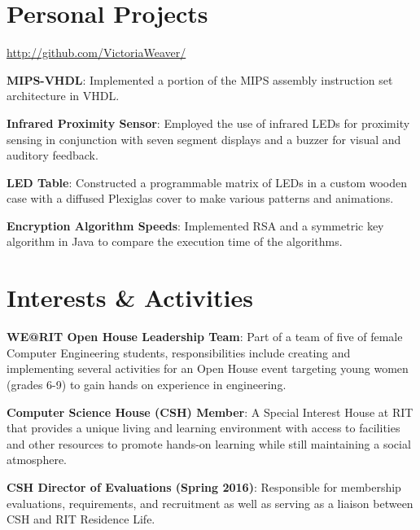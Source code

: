 \documentclass[a4paper,margin,line]{resume}
\begin{document}
\begin{resume}
\section{\mysidestyle Personal Projects}
    \begin{asparablank}
        \item \href{http://github.com/VictoriaWeaver/}{http://github.com/VictoriaWeaver/}\\
        \item \textbf{MIPS-VHDL}: Implemented a portion of the MIPS assembly instruction set 
            architecture in VHDL.\\
        \item \textbf{Infrared Proximity Sensor}: Employed the use of infrared LEDs for proximity 
            sensing in conjunction with seven segment displays and a buzzer for visual and auditory 
            feedback.\\
        \item \textbf{LED Table}: Constructed a programmable matrix of LEDs in a custom wooden 
            case with a diffused Plexiglas cover to make various patterns and animations.\\
        \item \textbf{Encryption Algorithm Speeds}: Implemented RSA and a symmetric key algorithm 
            in Java to compare the execution time of the algorithms.
    \end{asparablank}

\section{\mysidestyle Interests \& Activities}
    \begin{asparablank}
        \item \textbf{WE@RIT Open House Leadership Team}: Part of a team of five of female Computer Engineering students, 
        responsibilities include creating and implementing several activities for an Open House event targeting young women (grades 6-9) 
        to gain hands on experience in engineering.\\
        \item \textbf{Computer Science House (CSH) Member}: A Special Interest House at RIT that
            provides a unique living and learning environment with access to facilities and other resources to promote
            hands-on learning while still maintaining a social atmosphere.\\
        \item \textbf{CSH Director of Evaluations (Spring 2016)}: Responsible for membership evaluations, requirements, and recruitment 
            as well as serving as a liaison between CSH and RIT Residence Life.
    \end{asparablank}
\end{resume}
\end{document}
